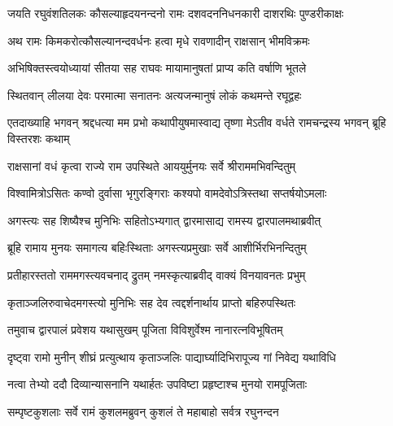 



\twolineshloka
{जयति रघुवंशतिलकः कौसल्याहृदयनन्दनो रामः}
{दशवदननिधनकारी दाशरथिः पुण्डरीकाक्षः} %


\twolineshloka
{अथ रामः किमकरोत्कौसल्यानन्दवर्धनः}
{हत्वा मृधे रावणादीन् राक्षसान् भीमविक्रमः} %

\twolineshloka
{अभिषिक्तस्त्वयोध्यायां सीतया सह राघवः}
{मायामानुषतां प्राप्य कति वर्षाणि भूतले} %

\twolineshloka
{स्थितवान् लीलया देवः परमात्मा सनातनः}
{अत्यजन्मानुषं लोकं कथमन्ते रघूद्वहः} %

\threelineshloka
{एतदाख्याहि भगवन् श्रद्दधत्या मम प्रभो}
{कथापीयुषमास्वाद्य तृष्णा मेऽतीव वर्धते}
{रामचन्द्रस्य भगवन् ब्रूहि विस्तरशः कथाम्} %


\twolineshloka
{राक्षसानां वधं कृत्वा राज्ये राम उपस्थिते}
{आययुर्मुनयः सर्वे श्रीराममभिवन्दितुम्} %

\twolineshloka
{विश्वामित्रोऽसितः कण्वो दुर्वासा भृगुरङ्गिराः}
{कश्यपो वामदेवोऽत्रिस्तथा सप्तर्षयोऽमलाः} %

\twolineshloka
{अगस्त्यः सह शिष्यैश्च मुनिभिः सहितोऽभ्यगात्}
{द्वारमासाद्य रामस्य द्वारपालमथाब्रवीत्} %

\twolineshloka
{ब्रूहि रामाय मुनयः समागत्य बहिःस्थिताः}
{अगस्त्यप्रमुखाः सर्वे आशीर्भिरभिनन्दितुम्} %

\twolineshloka
{प्रतीहारस्ततो राममगस्त्यवचनाद् द्रुतम्}
{नमस्कृत्याब्रवीद् वाक्यं विनयावनतः प्रभुम्} %

\twolineshloka
{कृताञ्जलिरुवाचेदमगस्त्यो मुनिभिः सह}
{देव त्वद्दर्शनार्थाय प्राप्तो बहिरुपस्थितः} %

\twolineshloka
{तमुवाच द्वारपालं प्रवेशय यथासुखम्}
{पूजिता विविशुर्वेश्म नानारत्नविभूषितम्} %

\twolineshloka
{दृष्ट्वा रामो मुनीन् शीघ्रं प्रत्युत्थाय कृताञ्जलिः}
{पाद्यार्घ्यादिभिरापूज्य गां निवेद्य यथाविधि} %

\twolineshloka
{नत्वा तेभ्यो ददौ दिव्यान्यासनानि यथार्हतः}
{उपविष्टा प्रहृष्टाश्च मुनयो रामपूजिताः} %

\twolineshloka
{सम्पृष्टकुशलाः सर्वे रामं कुशलमब्रुवन्}
{कुशलं ते महाबाहो सर्वत्र रघुनन्दन} %

